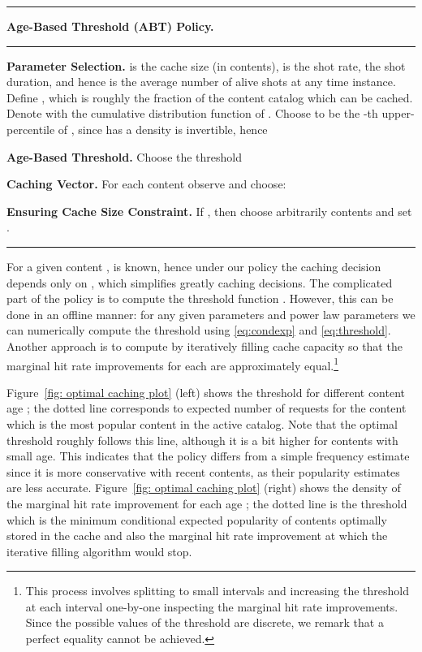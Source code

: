 \documentclass[10pt, conference, letterpaper]{IEEEtran}
\newcommand{\ABT}{\textsf{ABT}}
\newcommand{\spyros}[1]{{#1}}
\begin{document}
\noindent\rule{3.55in}{0.02in}

\noindent\textbf{Age-Based Threshold (\ABT) Policy.}

\vspace{-0.05in}
\noindent\rule{3.55in}{0.02in}

\noindent\textbf{Parameter Selection.} 
 is the cache size (in contents),  is the shot rate,  the shot duration, and hence  is the average number of alive shots at any time instance.
Define , which is roughly the fraction of the content catalog which can be cached.
Denote with  the \spyros {cumulative distribution function} of  . 
Choose  to be the -th upper-percentile of , since  has a density  is invertible, hence




\noindent\textbf{Age-Based Threshold.}
Choose the threshold  




\noindent\textbf{Caching Vector.}
  For each content  observe  and choose: 
	\vspace{-0.1in}

\noindent\textbf{Ensuring Cache Size Constraint.} If , then choose arbitrarily  contents and set .

\noindent\rule{3.55in}{0.02in}

For a given content ,  is known, hence under our policy the caching decision depends only on , which simplifies greatly caching decisions. The  complicated part of the policy is to compute the threshold function . However, this can be done in an offline manner: for any given parameters  and power law parameters  we can numerically compute the threshold using \eqref{eq:condexp} and \eqref{eq:threshold}. Another approach is to compute   by iteratively filling cache capacity so that the marginal hit rate improvements  for each  are approximately equal.\footnote{
This process involves splitting  to small intervals and increasing the threshold at each interval one-by-one inspecting the marginal hit rate improvements.
Since the possible values of the threshold  are discrete, we remark that a perfect equality cannot be achieved.}







Figure~\ref{fig: optimal caching plot} (left)  shows the   threshold  for different content age ; 
the dotted line corresponds to expected number of requests  for the content  which is the  most popular content in the active catalog.
Note that the optimal threshold roughly follows this line, although it is a bit higher for contents with small age. This indicates that the  policy differs from a simple frequency estimate since it is more conservative with recent contents, as their popularity estimates are less accurate. 
Figure~\ref{fig: optimal caching plot} (right) shows the density of the marginal hit rate improvement  for each age ; the dotted line is the threshold  which is the minimum conditional expected popularity of contents optimally stored in the cache and also the marginal hit rate improvement at which the iterative filling algorithm would stop.
\end{document}
